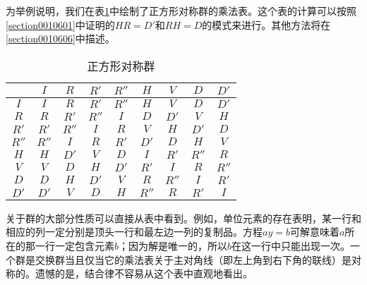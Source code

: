 为举例说明，我们在表\ref{table001060401}中绘制了正方形对称群的乘法表。这个表的计算可以按照\ref{section0010601}中证明的$HR=D'$和$RH=D$的模式来进行。其他方法将在\ref{section0010606}中描述。
\begin{table}[htbp]
\caption{正方形对称群}\label{table001060401}
\begin{center}
\begin{tabular}{|c|c|c|c|c|c|c|c|c|}
\hline
&$I$ & $R$ & $R'$ & $R''$ & $H$ & $V$ & $D$ & $D'$\\ \hline
$I$ & $I$ & $R$ & $R'$ & $R''$ & $H$ & $V$ & $D$ & $D'$ \\ \hline
$R$ & $R$ & $R'$ & $R''$ & $I$ & $D$ & $D'$ & $V$ & $H$ \\ \hline
$R'$ & $R'$ & $R''$ & $I$ & $R$ & $V$ & $H$ & $D'$ & $D$ \\ \hline
$R''$ & $R''$ & $I$ & $R$ & $R'$ & $D'$ & $D$ & $H$ & $V$ \\ \hline
$H$ & $H$ & $D'$ & $V$ & $D$ & $I$ & $R'$ & $R''$ & $R$ \\ \hline
$V$ & $V$ & $D$ & $H$ & $D'$ & $R'$ & $I$ & $R$ & $R''$ \\ \hline
$D$ & $D$ & $H$ & $D'$ & $V$ & $R$ & $R''$ & $I$ & $R'$ \\ \hline
$D'$ & $D'$ & $V$ & $D$ & $H$ & $R''$ & $R$ & $R'$ & $I$ \\ \hline
\end{tabular}
\end{center}
\end{table}

关于群的大部分性质可以直接从表中看到。例如，单位元素的存在表明，某一行和相应的列一定分别是顶头一行和最左边一列的复制品。方程$ay=b$可解意味着$a$所在的那一行一定包含元素$b$；因为解是唯一的，所以$b$在这一行中只能出现一次。一个群是交换群当且仅当它的乘法表关于主对角线（即左上角到右下角的联线）是对称的。遗憾的是，结合律不容易从这个表中直观地看出。


